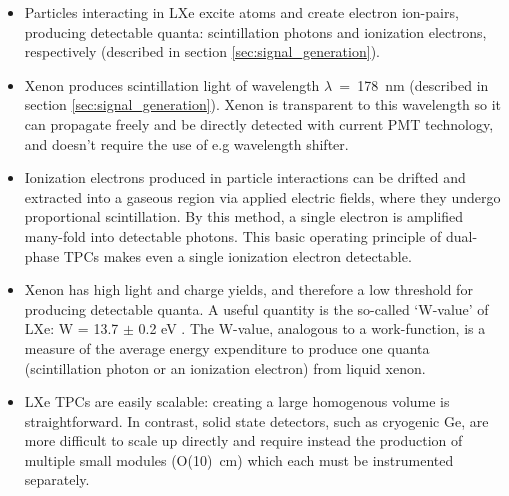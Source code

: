 \begin{itemize}
  \item Particles interacting in \ac{LXe} excite atoms and create electron ion-pairs, producing detectable quanta: scintillation photons and ionization electrons, respectively (described in section \ref{sec:signal_generation}).
  
  \item Xenon produces scintillation light of wavelength $\lambda$~=~178~nm (described in section \ref{sec:signal_generation}). Xenon is transparent to this wavelength so it can propagate freely and be directly detected with current \ac{PMT} technology, and doesn't require the use of e.g wavelength shifter. 
  
  \item Ionization electrons produced in particle interactions can be drifted and extracted into a gaseous region via applied electric fields, where they undergo proportional scintillation. By this method, a single electron is amplified many-fold into detectable photons. This basic operating principle of dual-phase \ac{TPC}s makes even a single ionization electron detectable. 
  
  \item Xenon has high light and charge yields, and therefore a low threshold for producing detectable quanta. A useful quantity is the so-called `W-value' of \ac{LXe}: W = 13.7 $\pm$ 0.2 eV \cite{Dahl2009}. The W-value, analogous to a work-function, is a measure of the average energy expenditure to produce one quanta (scintillation photon or an ionization electron) from liquid xenon. 
  
  \item \ac{LXe} \ac{TPC}s are easily scalable: creating a large homogenous volume is straightforward. In contrast, solid state detectors, such as cryogenic Ge, are more difficult to scale up directly and require instead the production of multiple small modules (O(10)~cm) which each must be instrumented separately.  
    
\end{itemize}


